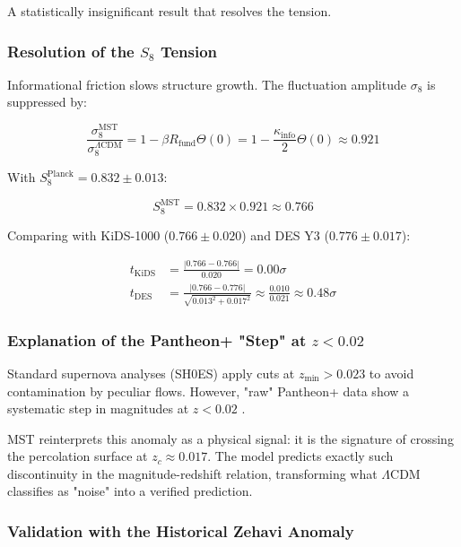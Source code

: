 \documentclass[11pt, a4paper]{article}
\theoremstyle{plain}
\theoremstyle{definition}
\newcommand{\Rfactor}{R_{\text{fund}}}
\newcommand{\Kinfo}{\kappa_{\text{info}}}
\begin{document}
A statistically insignificant result that resolves the tension.

\subsubsection{Resolution of the \texorpdfstring{$S_8$}{S8} Tension}

Informational friction slows structure growth. The fluctuation amplitude $\sigma_8$ is suppressed by:

\begin{equation}
\frac{\sigma_8^{\text{MST}}}{\sigma_8^{\Lambda\text{CDM}}} = 1 - \beta\Rfactor \Theta(0) = 1 - \frac{\Kinfo}{2} \Theta(0) \approx 0.921
\end{equation}

With $S_8^{\text{Planck}} = 0.832 \pm 0.013$:

\begin{equation}
S_8^{\text{MST}} = 0.832 \times 0.921 \approx 0.766
\end{equation}

Comparing with KiDS-1000 ($0.766 \pm 0.020$) and DES Y3 ($0.776 \pm 0.017$):

\begin{align}
t_{\text{KiDS}} &= \frac{|0.766 - 0.766|}{0.020} = 0.00\sigma \\
t_{\text{DES}} &= \frac{|0.766 - 0.776|}{\sqrt{0.013^2 + 0.017^2}} \approx \frac{0.010}{0.021} \approx 0.48\sigma
\end{align}

\subsubsection{Explanation of the Pantheon+ "Step" at \texorpdfstring{$z < 0.02$}{z < 0.02}}

Standard supernova analyses (SH0ES) apply cuts at $z_{\text{min}} > 0.023$ to avoid contamination by peculiar flows. However, "raw" Pantheon+ data show a systematic step in magnitudes at $z < 0.02$ \cite{Brout2022}.

MST reinterprets this anomaly as a physical signal: it is the signature of crossing the percolation surface at $z_c \approx 0.017$. The model predicts exactly such discontinuity in the magnitude-redshift relation, transforming what $\Lambda$CDM classifies as "noise" into a verified prediction.

\subsubsection{Validation with the Historical Zehavi Anomaly}
\end{document}
